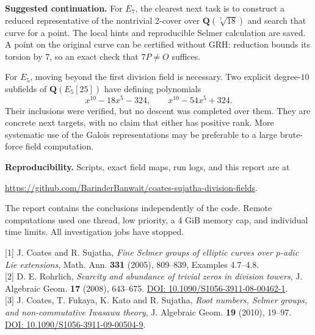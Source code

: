 \documentclass[11pt,a4paper]{article}
\newcommand{\Q}{\mathbf Q}
\begin{document}
\textbf{Suggested continuation.}
For $E_7$, the clearest next task is to construct a reduced representative of the nontrivial 2-cover over $\Q(\sqrt[7]{18})$ and search that curve for a point. The local hints and reproducible Selmer calculation are saved. A point on the original curve can be certified without GRH: reduction bounds its torsion by $7$, so an exact check that $7P\ne O$ suffices.

For $E_5$, moving beyond the first division field is necessary. Two explicit degree-$10$ subfields of $\Q(E_5[25])$ have defining polynomials
\[
 x^{10}-18x^5-324,\qquad x^{10}-54x^5+324.
\]
Their inclusions were verified, but no descent was completed over them. They are concrete next targets, with no claim that either has positive rank. More systematic use of the Galois representations may be preferable to a large brute-force field computation.

\textbf{Reproducibility.} Scripts, exact field maps, run logs, and this report are at
\begin{center}\small
\url{https://github.com/BarinderBanwait/coates-sujatha-division-fields}.
\end{center}
The report contains the conclusions independently of the code. Remote computations used one thread, low priority, a 4 GiB memory cap, and individual time limits. All investigation jobs have stopped.

\vspace{1mm}
{\footnotesize
[1] J. Coates and R. Sujatha, \emph{Fine Selmer groups of elliptic curves over $p$-adic Lie extensions}, Math. Ann. \textbf{331} (2005), 809--839, Examples 4.7--4.8.\\[3pt]
[2] D. E. Rohrlich, \emph{Scarcity and abundance of trivial zeros in division towers}, J. Algebraic Geom. \textbf{17} (2008), 643--675. \href{https://doi.org/10.1090/S1056-3911-08-00462-1}{DOI: 10.1090/S1056-3911-08-00462-1}.\\[3pt]
[3] J. Coates, T. Fukaya, K. Kato and R. Sujatha, \emph{Root numbers, Selmer groups, and non-commutative Iwasawa theory}, J. Algebraic Geom. \textbf{19} (2010), 19--97. \href{https://doi.org/10.1090/S1056-3911-09-00504-9}{DOI: 10.1090/S1056-3911-09-00504-9}.
}
\end{document}
